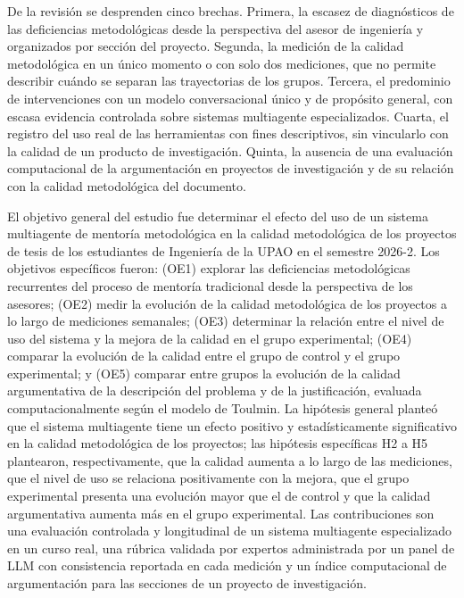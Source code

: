 \documentclass[journal]{IEEEtran}
\begin{document}
De la revisión se desprenden cinco brechas. Primera, la escasez de diagnósticos de las deficiencias metodológicas desde la perspectiva del asesor de ingeniería y organizados por sección del proyecto. Segunda, la medición de la calidad metodológica en un único momento o con solo dos mediciones, que no permite describir cuándo se separan las trayectorias de los grupos. Tercera, el predominio de intervenciones con un modelo conversacional único y de propósito general, con escasa evidencia controlada sobre sistemas multiagente especializados. Cuarta, el registro del uso real de las herramientas con fines descriptivos, sin vincularlo con la calidad de un producto de investigación. Quinta, la ausencia de una evaluación computacional de la argumentación en proyectos de investigación y de su relación con la calidad metodológica del documento.

El objetivo general del estudio fue determinar el efecto del uso de un sistema multiagente de mentoría metodológica en la calidad metodológica de los proyectos de tesis de los estudiantes de Ingeniería de la UPAO en el semestre 2026-2. Los objetivos específicos fueron: (OE1) explorar las deficiencias metodológicas recurrentes del proceso de mentoría tradicional desde la perspectiva de los asesores; (OE2) medir la evolución de la calidad metodológica de los proyectos a lo largo de mediciones semanales; (OE3) determinar la relación entre el nivel de uso del sistema y la mejora de la calidad en el grupo experimental; (OE4) comparar la evolución de la calidad entre el grupo de control y el grupo experimental; y (OE5) comparar entre grupos la evolución de la calidad argumentativa de la descripción del problema y de la justificación, evaluada computacionalmente según el modelo de Toulmin. La hipótesis general planteó que el sistema multiagente tiene un efecto positivo y estadísticamente significativo en la calidad metodológica de los proyectos; las hipótesis específicas H2 a H5 plantearon, respectivamente, que la calidad aumenta a lo largo de las mediciones, que el nivel de uso se relaciona positivamente con la mejora, que el grupo experimental presenta una evolución mayor que el de control y que la calidad argumentativa aumenta más en el grupo experimental. Las contribuciones son una evaluación controlada y longitudinal de un sistema multiagente especializado en un curso real, una rúbrica validada por expertos administrada por un panel de LLM con consistencia reportada en cada medición y un índice computacional de argumentación para las secciones de un proyecto de investigación.
\end{document}
